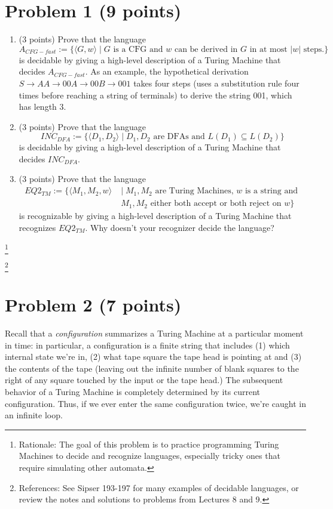 \documentclass[letterpaper,11pt,twoside]{article}
\theoremstyle{plain}
\theoremstyle{definition}
\theoremstyle{remark}
\theoremstyle{restate}
\newcommand\blfootnote[1]{%
  \begingroup
  \renewcommand\thefootnote{}\footnote{#1}%
  \addtocounter{footnote}{-1}%
  \endgroup
}
\begin{document}
\clearpage
\section{Problem 1 (9 points)}

\begin{enumerate}
    \item (3 points) Prove that the language
    \[
    A_{CFG-fast} := \{ \langle G, w \rangle \; | \; G \text{ is a CFG and } w \text{ can be derived in } G \text{ in at most } |w| \text{ steps.} \}
    \]
    is decidable by giving a high-level description of a Turing Machine that decides $A_{CFG-fast}$. As an example, the hypothetical derivation $S \rightarrow AA \rightarrow 00A \rightarrow 00B \rightarrow 001$ takes four steps (uses a substitution rule four times before reaching a string of terminals) to derive the string 001, which has length 3.

    \item (3 points) Prove that the language
    \[
    INC_{DFA} := \{ \langle D_1, D_2 \rangle \; | \; D_1, D_2 \text{ are DFAs and } L(D_1) \subseteq L(D_2) \}
    \]
    is decidable by giving a high-level description of a Turing Machine that decides $INC_{DFA}$.
    
    \item (3 points) Prove that the language
    \begin{align*}
    EQ2_{TM} := \{\langle M_1, M_2, w \rangle \; &| \; M_1, M_2 \text{ are Turing Machines, } w \text{ is a string and } \\
    &M_1, M_2 \text{ either both accept or both reject on } w\}
    \end{align*}
    is recognizable by giving a high-level description of a Turing Machine that recognizes $EQ2_{TM}$. Why doesn't your recognizer decide the language?
\end{enumerate}


    \blfootnote{ Rationale: The goal of this problem is to practice programming Turing Machines to decide and recognize languages, especially tricky ones that require simulating other automata. }
    \blfootnote{ References: See Sipser 193-197 for many examples of decidable languages, or review the notes and solutions to problems from Lectures 8 and 9. }



\clearpage
\section{Problem 2 (7 points)}
    Recall that a \emph{configuration} summarizes a Turing Machine at a particular moment in time: in particular, a configuration is a finite string that includes (1) which internal state we're in, (2) what tape square the tape head is pointing at and (3) the contents of the tape (leaving out the infinite number of blank squares to the right of any square touched by the input or the tape head.) The subsequent behavior of a Turing Machine is completely determined by its current configuration. Thus, if we ever enter the same configuration twice, we're caught in an infinite loop.
    
\end{document}
